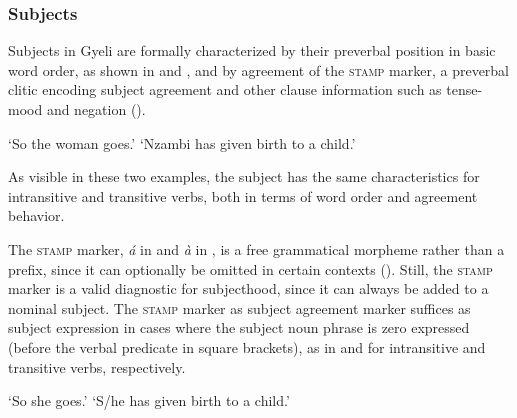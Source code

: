 \subsubsection{Subjects}
\label{sec:SBJ}

Subjects in Gyeli are formally characterized by their preverbal position in basic word order, as shown in  and , and by agreement of the \textsc{stamp} marker, a preverbal clitic encoding subject agreement and other clause information such as tense-mood and negation (). 

    \trans `So the woman goes.'
    \trans `Nzambi has given birth to a child.'
\z

\noindent As visible in these two examples, the subject has the same characteristics for intransitive and transitive verbs, both in terms of word order and agreement behavior. 

The \textsc{stamp} marker, {\itshape á} in  and {\itshape à} in , is a free grammatical morpheme rather than a prefix, since it can optionally be omitted in certain contexts ().
Still, the \textsc{stamp} marker is a valid diagnostic for subjecthood, since it can always be added to a nominal subject. The \textsc{stamp} marker as subject agreement marker suffices as subject expression in cases where the subject noun phrase is zero expressed (before the verbal predicate in square brackets), as in  and  for intransitive and transitive verbs, respectively.

    \trans `So she goes.'
    \trans `S/he has given birth to a child.'
\z



